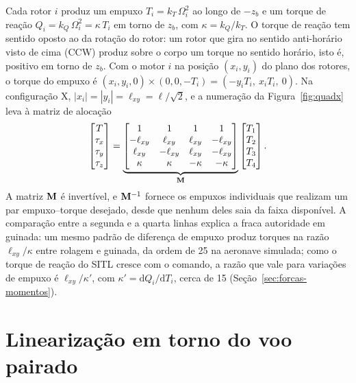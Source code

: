 Cada rotor $i$ produz um empuxo $T_i = k_T\,\Omega_i^2$ ao longo de $-z_b$ e
um torque de reação $Q_i = k_Q\,\Omega_i^2 = \kappa\,T_i$ em torno de $z_b$,
com $\kappa = k_Q/k_T$. O torque de reação tem sentido oposto ao da rotação do
rotor: um rotor que gira no sentido anti-horário visto de cima (CCW) produz
sobre o corpo um torque no sentido horário, isto é, positivo em torno de
$z_b$. Com o motor $i$ na posição $(x_i, y_i)$ do plano dos rotores, o torque
do empuxo é $(x_i, y_i, 0)\times(0, 0, -T_i) = (-y_i T_i,\ x_i T_i,\ 0)$. Na
configuração X, $|x_i| = |y_i| = \ell_{xy} = \ell/\sqrt{2}$, e a numeração da
Figura~\ref{fig:quadx} leva à matriz de alocação
\begin{equation}
\begin{bmatrix} T \\ \tau_x \\ \tau_y \\ \tau_z \end{bmatrix} =
\underbrace{\begin{bmatrix}
1          & 1          & 1          & 1 \\
-\ell_{xy} & \ell_{xy}  & \ell_{xy}  & -\ell_{xy} \\
\ell_{xy}  & -\ell_{xy} & \ell_{xy}  & -\ell_{xy} \\
\kappa     & \kappa     & -\kappa    & -\kappa
\end{bmatrix}}_{\mathbf{M}}
\begin{bmatrix} T_1 \\ T_2 \\ T_3 \\ T_4 \end{bmatrix}.
\label{eq:alocacao}
\end{equation}
A matriz $\mathbf{M}$ é invertível, e $\mathbf{M}^{-1}$ fornece os empuxos
individuais que realizam um par empuxo--torque desejado, desde que nenhum
deles saia da faixa disponível. A comparação entre a segunda e a quarta linhas
explica a fraca autoridade em guinada: um mesmo padrão de diferença de empuxo
produz torques na razão $\ell_{xy}/\kappa$ entre rolagem e guinada, da ordem
de 25 na aeronave simulada; como o torque de reação do SITL cresce com o
comando, a razão que vale para variações de empuxo é $\ell_{xy}/\kappa'$, com
$\kappa' = \mathrm{d}Q_i/\mathrm{d}T_i$, cerca de 15
(Seção~\ref{sec:forcas-momentos}).

\section{Linearização em torno do voo pairado}
\label{sec:linearizacao}

